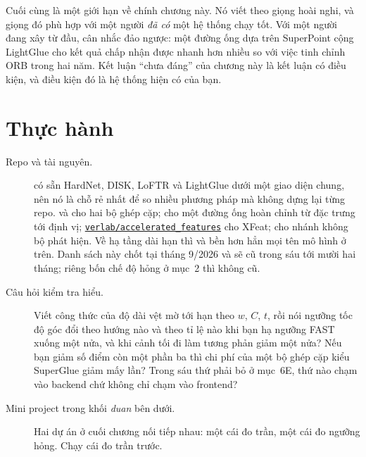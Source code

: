\documentclass[../../deep_learning.tex]{subfiles}
\begin{document}
Cuối cùng là một giới hạn về chính chương này. Nó viết theo giọng hoài nghi, và giọng đó phù hợp với một người \emph{đã có} một hệ thống chạy tốt. Với một người đang xây từ đầu, cân nhắc đảo ngược: một đường ống dựa trên SuperPoint cộng LightGlue cho kết quả chấp nhận được nhanh hơn nhiều so với việc tinh chỉnh ORB trong hai năm. Kết luận ``chưa đáng'' của chương này là kết luận có điều kiện, và điều kiện đó là hệ thống hiện có của bạn.

\section{Thực hành}
\begin{description}
\item[Repo và tài nguyên.]  có sẵn HardNet, DISK, LoFTR và LightGlue dưới một giao diện chung, nên nó là chỗ rẻ nhất để so nhiều phương pháp mà không dựng lại từng repo.  và  cho hai bộ ghép cặp;  cho một đường ống hoàn chỉnh từ đặc trưng tới định vị; \href{https://github.com/verlab/accelerated_features}{\texttt{\color{steel}verlab/accelerated\_features}} cho XFeat;  cho nhánh không bộ phát hiện. Về hạ tầng dài hạn thì  và  bền hơn hẳn mọi tên mô hình ở trên. Danh sách này chốt tại tháng 9/2026 và sẽ cũ trong sáu tới mười hai tháng; riêng bốn chế độ hỏng ở mục~2 thì không cũ.
\item[Câu hỏi kiểm tra hiểu.] Viết công thức của độ dài vệt mờ tới hạn theo \(w\), \(C\), \(t\), rồi nói ngưỡng tốc độ góc đổi theo hướng nào và theo tỉ lệ nào khi bạn hạ ngưỡng FAST xuống một nửa, và khi cảnh tối đi làm tương phản giảm một nửa? Nếu bạn giảm số điểm còn một phần ba thì chi phí của một bộ ghép cặp kiểu SuperGlue giảm mấy lần? Trong sáu thứ phải bỏ ở mục~6E, thứ nào chạm vào backend chứ không chỉ chạm vào frontend?
\item[Mini project trong khối \emph{duan} bên dưới.] Hai dự án ở cuối chương nối tiếp nhau: một cái đo trần, một cái đo ngưỡng hỏng. Chạy cái đo trần trước.
\end{description}
\end{document}
